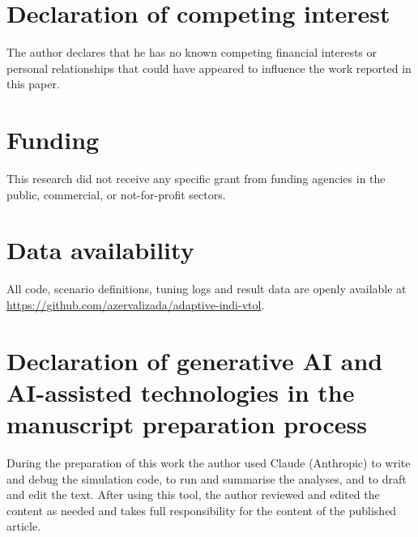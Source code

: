 \documentclass[preprint,12pt,a4paper]{elsarticle}
\begin{document}
\section*{Declaration of competing interest}
The author declares that he has no known competing financial interests or personal relationships that could have appeared to
influence the work reported in this paper.

\section*{Funding}
This research did not receive any specific grant from funding agencies in the public, commercial, or not-for-profit sectors.

\section*{Data availability}
All code, scenario definitions, tuning logs and result data are openly available at
\url{https://github.com/azervalizada/adaptive-indi-vtol}.

\section*{Declaration of generative AI and AI-assisted technologies in the manuscript preparation process}
During the preparation of this work the author used Claude (Anthropic) to write and debug the simulation code, to run and summarise
the analyses, and to draft and edit the text. After using this tool, the author reviewed and edited the content as needed and takes
full responsibility for the content of the published article.
\end{document}
